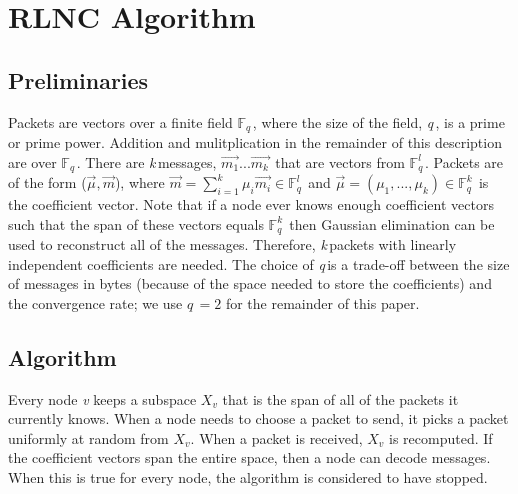 \documentclass{article} %
\def\numMessages{\textit{k}\,}
\def\fieldSize{\textit{q}\,}
\begin{document}
\section{RLNC Algorithm}\label{subsec:RLNC}
\subsection{Preliminaries}
Packets are vectors over a finite field $\mathbb{F}_{\fieldSize}$, where the size of the field, \fieldSize, is a prime or prime power. Addition and mulitplication in the remainder of this description are over $\mathbb{F}_{\fieldSize}$. There are \numMessages messages, $\vec{m_{1}}...\vec{m_{\numMessages}}$ that are vectors from $\mathbb{F}_{\fieldSize}^{l}$. Packets are of the form ($\vec{\mu}, \vec{m}$), where $\vec{m} = \sum_{i=1}^{\numMessages} \mu_i\vec{m_i} \in \mathbb{F}_{\fieldSize}^{l}$ and $\vec{\mu} = (\mu_1,...,\mu_k) \in \mathbb{F}_{\fieldSize}^{\numMessages}$ is the coefficient vector. Note that if a node ever knows enough coefficient vectors such that the span of these vectors equals $\mathbb{F}_{\fieldSize}^{\numMessages}$ then Gaussian elimination can be used to reconstruct all of the messages. Therefore, \numMessages packets with linearly independent coefficients are needed. The choice of \fieldSize is a trade-off between the size of messages in bytes (because of the space needed to store the coefficients) and the convergence rate; we use $\fieldSize=2$ for the remainder of this paper. 
\subsection{Algorithm}
Every node \textit{v} keeps a subspace $X_v$ that is the span of all of the packets it currently knows. When a node needs to choose a packet to send, it picks a packet uniformly at random from $X_v$. When a packet is received, $X_v$ is recomputed. If the coefficient vectors span the entire space, then a node can decode messages. When this is true for every node, the algorithm is considered to have stopped. 
\end{document}
